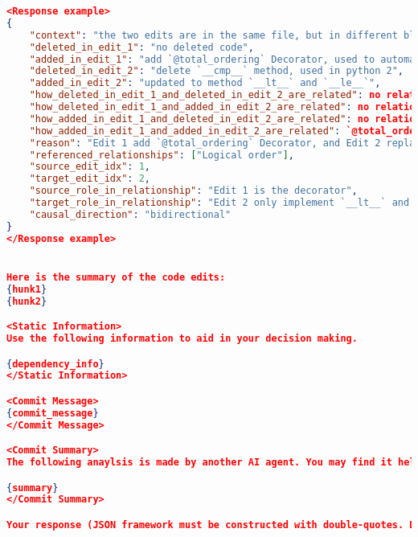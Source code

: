 \begin{lstlisting}[language=json, basicstyle=\fontsize{8}{10}\selectfont\ttfamily]
<Response example>
{
    "context": "the two edits are in the same file, but in different block. They are likely to be unrelated.",
    "deleted_in_edit_1": "no deleted code",
    "added_in_edit_1": "add `@total_ordering` Decorator, used to automatically derive comparison methods",
    "deleted_in_edit_2": "delete `__cmp__` method, used in python 2",
    "added_in_edit_2": "updated to method `__lt__` and `__le__`",
    "how_deleted_in_edit_1_and_deleted_in_edit_2_are_related": no relationship,
    "how_deleted_in_edit_1_and_added_in_edit_2_are_related": no relationship,
    "how_added_in_edit_1_and_deleted_in_edit_2_are_related": no relationship,
    "how_added_in_edit_1_and_added_in_edit_2_are_related": `@total_ordering` combines `__lt__` and `__le__` to automatically derive other comparison methods,
    "reason": "Edit 1 add `@total_ordering` Decorator, and Edit 2 replaced method `__cmp__` with `__lt__` and `__le__`. When 2 edits are combined together, the decorator ensures all comparison methods are derived automatically based on the explicitly defined `__lt__` and `__le__`",
    "referenced_relationships": ["Logical order"],
    "source_edit_idx": 1,
    "target_edit_idx": 2,
    "source_role_in_relationship": "Edit 1 is the decorator",
    "target_role_in_relationship": "Edit 2 only implement `__lt__` and `__le__` because of the decorator",
    "causal_direction": "bidirectional"
}
</Response example>


Here is the summary of the code edits:
{hunk1}
{hunk2}

<Static Information>
Use the following information to aid in your decision making.

{dependency_info}
</Static Information>

<Commit Message>
{commit_message}
</Commit Message>

<Commit Summary>
The following anaylsis is made by another AI agent. You may find it helpful to refer to it. 

{summary}
</Commit Summary>

Your response (JSON framework must be constructed with double-quotes. Do not enclose JSON content between ```json and ``` tags).
\end{lstlisting}    